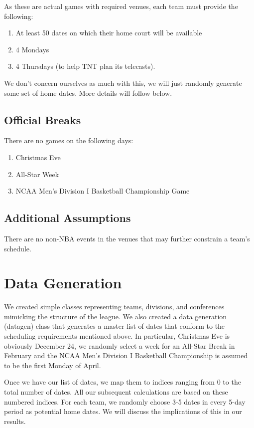 \documentclass{article}
\begin{document}
	As these are actual games with required venues, each team must provide the following:

	\begin{enumerate}
		\item At least 50 dates on which their home court will be available
		\item 4 Mondays
		\item 4 Thursdays (to help TNT plan its telecasts).
	\end{enumerate}

	We don't concern ourselves as much with this, we will just randomly generate some set of home dates. More details will follow below.

	\subsection{Official Breaks}

	There are no games on the following days:

	\begin{enumerate}
		\item Christmas Eve
		\item All-Star Week
		\item NCAA Men's Division I Basketball Championship Game
	\end{enumerate}

    \subsection{Additional Assumptions}
    There are no non-NBA events in the venues that may further constrain a team's schedule.
    
	\section{Data Generation}

	We created simple classes representing teams, divisions, and conferences mimicking the structure of the league. We also created a data generation (datagen) class that generates a master list of dates that conform to the scheduling requirements mentioned above. In particular, Christmas Eve is obviously December 24, we randomly select a week for an All-Star Break in February and the NCAA Men's Division I Basketball Championship is assumed to be the first Monday of April.

	Once we have our list of dates, we map them to indices ranging from 0 to the total number of dates. All our subsequent calculations are based on these numbered indices. For each team, we randomly choose 3-5 dates in every 5-day period as potential home dates. We will discuss the implications of this in our results.
\end{document}
